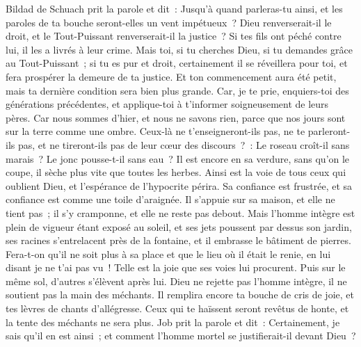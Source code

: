 \begin{multicols}{2}
\VerseOne{}Bildad de Schuach prit la parole et dit~:
Jusqu'à quand parleras-tu ainsi, et les paroles de ta bouche seront-elles un vent impétueux~?
Dieu renverserait-il le droit, et le Tout-Puissant renverserait-il la justice~?
Si tes fils ont péché contre lui, il les a livrés à leur crime.
Mais toi, si tu cherches Dieu, si tu demandes grâce au Tout-Puissant~;
si tu es pur et droit, certainement il se réveillera pour toi, et fera prospérer la demeure de ta justice.
Et ton commencement aura été petit, mais ta dernière condition sera bien plus grande.
Car, je te prie, enquiers-toi des générations précédentes, et applique-toi à t'informer soigneusement de leurs pères.
Car nous sommes d'hier, et nous ne savons rien, parce que nos jours sont sur la terre comme une ombre.
Ceux-là ne t'enseigneront-ils pas, ne te parleront-ils pas, et ne tireront-ils pas de leur cœur des discours~?~:
Le roseau croît-il sans marais~? Le jonc pousse-t-il sans eau~?
Il est encore en sa verdure, sans qu'on le coupe, il sèche plus vite que toutes les herbes.
Ainsi est la voie de tous ceux qui oublient Dieu, et l'espérance de l'hypocrite périra.
Sa confiance est frustrée, et sa confiance est comme une toile d'araignée.
Il s'appuie sur sa maison, et elle ne tient pas~; il s'y cramponne, et elle ne reste pas debout.
Mais l'homme intègre est plein de vigueur étant exposé au soleil, et ses jets poussent par dessus son jardin,
ses racines s'entrelacent près de la fontaine, et il embrasse le bâtiment de pierres.
Fera-t-on qu'il ne soit plus à sa place et que le lieu où il était le renie, en lui disant je ne t'ai pas vu~! 
Telle est la joie que ses voies lui procurent. Puis sur le même sol, d'autres s'élèvent après lui.
Dieu ne rejette pas l'homme intègre, il ne soutient pas la main des méchants.
Il remplira encore ta bouche de cris de joie, et tes lèvres de chants d'allégresse.
Ceux qui te haïssent seront revêtus de honte, et la tente des méchants ne sera plus.
\VerseOne{}Job prit la parole et dit~:
Certainement, je sais qu'il en est ainsi~; et comment l'homme mortel se justifierait-il devant Dieu~?

\end{multicols}
